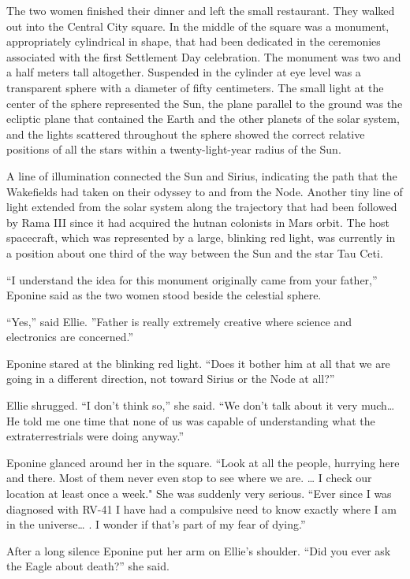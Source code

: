 \documentclass[]{article}
\begin{document}
{The two women finished their dinner and left the small restaurant.  They walked out into the Central City square.  In the middle of the square was a monument, appropriately cylindrical in shape, that had been dedicated in the ceremonies associated with the first Settlement Day celebration.  The monument was two and a half meters tall altogether.  Suspended in the cylinder at eye level was a transparent sphere with a diameter of fifty centimeters.  The small light at the center of the sphere represented the Sun, the plane parallel to the ground was the ecliptic plane that contained the Earth and the other planets of the solar system, and the lights scattered throughout the sphere showed the correct relative positions of all the stars within a twenty-light-year radius of the Sun.

A line of illumination connected the Sun and Sirius, indicating the path that the Wakefields had taken on their odyssey to and from the Node.  Another tiny line of light extended from the solar system along the trajectory that had been followed by Rama III since it had acquired the hutnan colonists in Mars orbit.  The host spacecraft, which was represented by a large, blinking red light, was currently in a position about one third of the way between the Sun and the star Tau Ceti.

“I understand the idea for this monument originally came from your father,” Eponine said as the two women stood beside the celestial sphere.

“Yes,” said Ellie.  ”Father is really extremely creative where science and electronics are concerned.”

Eponine stared at the blinking red light.  “Does it bother him at all that we are going in a different direction, not toward Sirius or the Node at all?”

Ellie shrugged.  “I don’t think so,” she said.  “We don’t talk about it very much… He told me one time that none of us was capable of understanding what the extraterrestrials were doing anyway.”

Eponine glanced around her in the square.  “Look at all the people, hurrying here and there.  Most of them never even stop to see where we are.  … I check our location at least once a week."  She was suddenly very serious.  “Ever since I was diagnosed with RV-41 I have had a compulsive need to know exactly where I am in the universe… .  I wonder if that’s part of my fear of dying.”

After a long silence Eponine put her arm on Ellie’s shoulder.  “Did you ever ask the Eagle about death?” she said.

}
\end{document}

